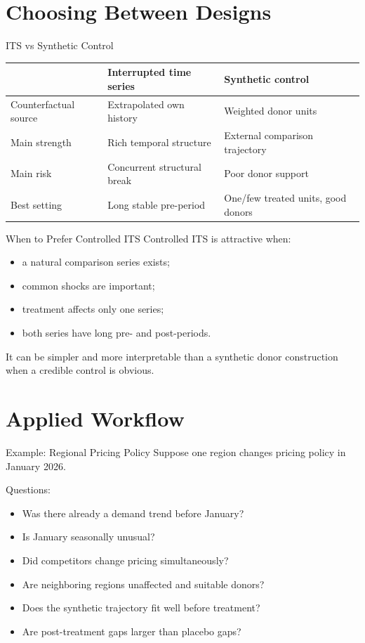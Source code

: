 \documentclass[aspectratio=169,11pt]{beamer}
\begin{document}
\section{Choosing Between Designs}

\begin{frame}{ITS vs Synthetic Control}
\begin{tabular}{p{3.3cm}p{4.4cm}p{4.4cm}}
\toprule
& \textbf{Interrupted time series} & \textbf{Synthetic control} \\
\midrule
Counterfactual source & Extrapolated own history & Weighted donor units \\
Main strength & Rich temporal structure & External comparison trajectory \\
Main risk & Concurrent structural break & Poor donor support \\
Best setting & Long stable pre-period & One/few treated units, good donors \\
\bottomrule
\end{tabular}
\end{frame}

\begin{frame}{When to Prefer Controlled ITS}
Controlled ITS is attractive when:
\begin{itemize}
\item a natural comparison series exists;
\item common shocks are important;
\item treatment affects only one series;
\item both series have long pre- and post-periods.
\end{itemize}

It can be simpler and more interpretable than a synthetic donor construction when a credible control is obvious.
\end{frame}

\section{Applied Workflow}

\begin{frame}{Example: Regional Pricing Policy}
Suppose one region changes pricing policy in January 2026.

Questions:
\begin{itemize}
\item Was there already a demand trend before January?
\item Is January seasonally unusual?
\item Did competitors change pricing simultaneously?
\item Are neighboring regions unaffected and suitable donors?
\item Does the synthetic trajectory fit well before treatment?
\item Are post-treatment gaps larger than placebo gaps?
\end{itemize}
\end{frame}
\end{document}
